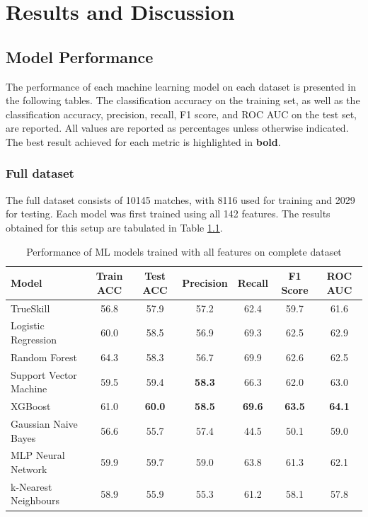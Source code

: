 \chapter{Results and Discussion}
\label{Results}

\section{Model Performance}

The performance of each machine learning model on each dataset is presented in the following tables. The classification accuracy on the training set, as well as the classification accuracy, precision, recall, F1 score, and ROC AUC on the test set, are reported. All values are reported as percentages unless otherwise indicated. The best result achieved for each metric is highlighted in \textbf{bold}.

\subsection{Full dataset}

The full dataset consists of 10145 matches, with 8116 used for training and 2029 for testing. Each model was first trained using all 142 features. The results obtained for this setup are tabulated in Table \ref{table:1}.

\begin{table}[h!]
	\centering
	\small
	\begin{adjustbox}{center} %
		\begin{tabular}{ |l|c|c|c|c|c|c| }
			\hline
			\rule{0pt}{2.6ex} \textbf{Model} & \textbf{Train ACC} & \textbf{Test ACC} & \textbf{Precision} & \textbf{Recall} & \textbf{F1 Score} & \textbf{ROC AUC} \\
			\hline
			\rule{0pt}{2.6ex} TrueSkill                 & 56.8 & 57.9 & 57.2 & 62.4 & 59.7 & 61.6 \\ \hline
			\rule{0pt}{2.6ex} Logistic Regression 		& 60.0 & 58.5 & 56.9 & 69.3 & 62.5 & 62.9 \\
			\rule{0pt}{2.6ex} Random Forest 			& 64.3 & 58.3 & 56.7 & 69.9 & 62.6 & 62.5 \\
			\rule{0pt}{2.6ex} Support Vector Machine 	& 59.5 & 59.4 & \textbf{58.3} & 66.3 & 62.0 & 63.0 \\
			\rule{0pt}{2.6ex} XGBoost 					& 61.0 & \textbf{60.0} & \textbf{58.5} &\textbf{ 69.6} & \textbf{63.5} & \textbf{64.1} \\
			\rule{0pt}{2.6ex} Gaussian Naive Bayes 		& 56.6 & 55.7 & 57.4 & 44.5 & 50.1 & 59.0 \\
			\rule{0pt}{2.6ex} MLP Neural Network 		& 59.9 & 59.7 & 59.0 & 63.8 & 61.3 & 62.1 \\
			\rule{0pt}{2.6ex} k-Nearest Neighbours 		& 58.9 & 55.9 & 55.3 & 61.2 & 58.1 & 57.8 \\
			\hline
		\end{tabular}
	\end{adjustbox}
	\caption{Performance of ML models trained with all features on complete dataset}
	\label{table:1}
\end{table}

